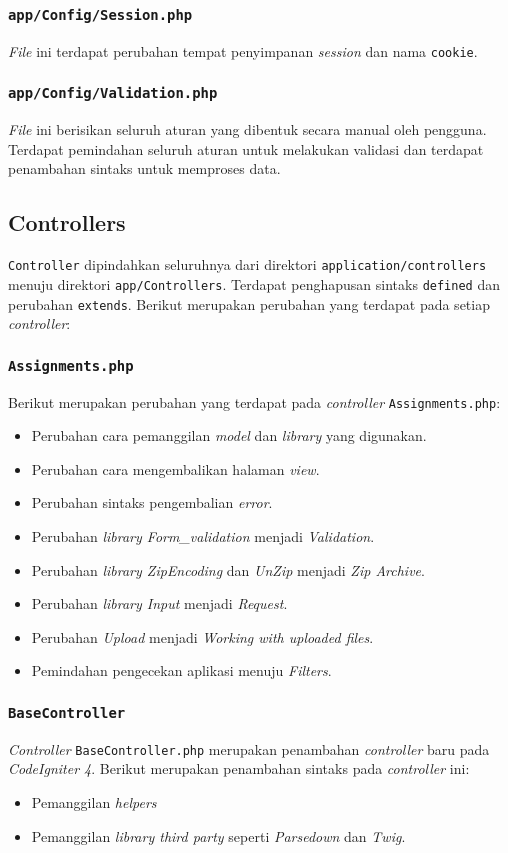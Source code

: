 \subsubsection{\texttt{app/Config/Session.php}}
\textit{File} ini terdapat perubahan tempat penyimpanan \textit{session} dan nama \texttt{cookie}.
\subsubsection{\texttt{app/Config/Validation.php}}
\textit{File} ini berisikan seluruh aturan yang dibentuk secara manual oleh pengguna. Terdapat pemindahan seluruh aturan untuk melakukan validasi dan terdapat penambahan sintaks untuk memproses data.

\subsection{Controllers}
\texttt{Controller} dipindahkan seluruhnya dari direktori \texttt{application/controllers} menuju direktori \texttt{app/Controllers}. Terdapat penghapusan sintaks \texttt{defined} dan perubahan \texttt{extends}. Berikut merupakan perubahan yang terdapat pada setiap \textit{controller}:
\subsubsection{\texttt{Assignments.php}}
Berikut merupakan perubahan yang terdapat pada \textit{controller} \texttt{Assignments.php}:
\begin{itemize}
	\item Perubahan cara pemanggilan \textit{model} dan \textit{library} yang digunakan.
	\item Perubahan cara mengembalikan halaman \textit{view}.
	\item Perubahan sintaks pengembalian \textit{error}.
	\item Perubahan \textit{library Form\_validation} menjadi \textit{Validation}.
	\item Perubahan \textit{library ZipEncoding} dan \textit{UnZip} menjadi \textit{Zip Archive}.
	\item Perubahan \textit{library Input} menjadi \textit{Request}.
	\item Perubahan \textit{Upload} menjadi \textit{Working with uploaded files}.
	\item Pemindahan pengecekan aplikasi menuju \textit{Filters}.
\end{itemize}
\subsubsection{\texttt{BaseController}}
\textit{Controller} \texttt{BaseController.php} merupakan penambahan \textit{controller} baru pada \textit{CodeIgniter 4}. Berikut merupakan penambahan sintaks pada \textit{controller} ini:
\begin{itemize}
	\item Pemanggilan \textit{helpers}
	\item Pemanggilan \textit{library third party} seperti \textit{Parsedown} dan \textit{Twig}.
\end{itemize}


